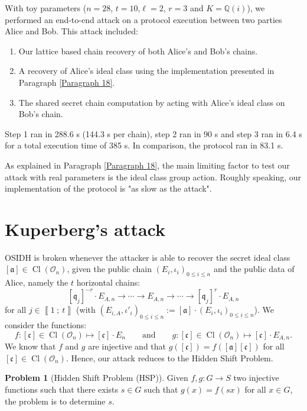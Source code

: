 \documentclass[a4paper,10pt,notitlepage]{report}
\theoremstyle{definition}
\theoremstyle{plain}
\theoremstyle{definition}
\newtheorem{Problem}[Definition]{Problem}
\newcommand{\Q}{\mathbb{Q}}
\newcommand{\mO}{\mathcal{O}}
\renewcommand{\i}[2]{\left\llbracket #1~;~#2\right\rrbracket}
\renewcommand{\(}{\left(}
\renewcommand{\)}{\right)}
\newcommand{\mf}[1]{\mathfrak{#1}}
\DeclareMathOperator{\Cl}{Cl}
\begin{document}
With toy parameters ($n=28$, $t=10$,$\ell=2$, $r=3$ and $K=\Q(i)$), we performed an end-to-end attack on a protocol execution between two parties Alice and Bob. This attack included:
\begin{enumerate}
\item Our lattice based chain recovery of both Alice's and Bob's chains.
\item A recovery of Alice's ideal class using the implementation presented in Paragraph \ref{Paragraph 18}.
\item The shared secret chain computation by acting with Alice's ideal class on Bob's chain.
\end{enumerate}
Step 1 ran in 288.6 s (144.3 s per chain), step 2 ran in 90 s and step 3 ran in 6.4 s for a total execution time of 385 s. In comparison, the protocol ran in 83.1 s.

As explained in Paragraph \ref{Paragraph 18}, the main limiting factor to test our attack with real parameters is the ideal class group action. Roughly speaking, our implementation of the protocol is "as slow as the attack".

\section{Kuperberg's attack}\label{Paragraph 23}

OSIDH is broken whenever the attacker is able to recover the secret ideal class $[\mf{a}]\in\Cl(\mO_n)$, given the public chain $(E_i,\iota_i)_{0\leq i\leq n}$ and the public data of Alice, namely the $t$ horizontal chains:
\[[\mf{q}_j]^{-r}\cdot E_{A,n}\longrightarrow \cdots \longrightarrow E_{A,n} \longrightarrow \cdots \longrightarrow [\mf{q}_j]^{r}\cdot E_{A,n}\]
for all $j\in\i{1}{t}$ (with $(E_{i,A},\iota'_i)_{0\leq i\leq n}:=[\mf{a}]\cdot (E_i,\iota_i)_{0\leq i\leq n}$). We consider the functions:
\[f: [\mf{c}]\in\Cl(\mO_n)\longmapsto [\mf{c}]\cdot E_n \qquad \mbox{and} \qquad g: [\mf{c}]\in\Cl(\mO_n)\longmapsto [\mf{c}]\cdot E_{A,n}.\]
We know that $f$ and $g$ are injective and that $g([\mf{c}])=f([\mf{a}][\mf{c}])$ for all $[\mf{c}]\in\Cl(\mO_n)$. Hence, our attack reduces to the Hidden Shift Problem.

\begin{Problem}[Hidden Shift Problem (HSP)]\label{Problem 4}
Given $f,g: G\longrightarrow S$ two injective functions such that there exists $s\in G$ such that $g(x)=f(sx)$ for all $x\in G$, the problem is to determine $s$.
\end{Problem}
\end{document}
